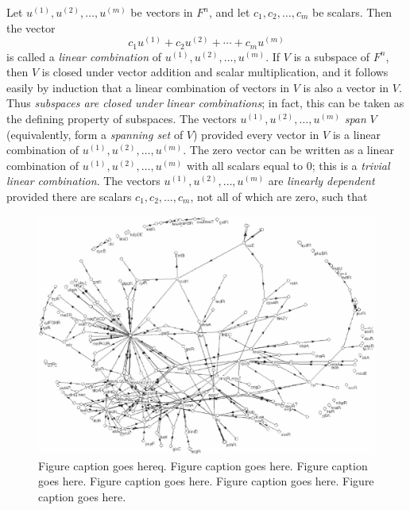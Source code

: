 \begin{definition}\label{1def:linearcomb}{\rm
Let $u^{(1)},u^{(2)},\ldots,u^{(m)}$ be vectors in $F^n$, and let 
$c_1,c_2,\ldots,c_m$ be scalars. Then the vector
\[c_1u^{(1)}+c_2u^{(2)}+\cdots+c_mu^{(m)}\]
is called a {\it linear combination}  of $u^{(1)},u^{(2)},\ldots,u^{(m)}$.
If $V$ is a subspace of $F^n$, then $V$ is closed under vector addition and 
scalar multiplication, and it follows easily by induction that a 
linear combination of vectors in $V$ is also a vector in $V$. Thus 
{\it subspaces 
are closed under linear combinations}; in fact, this can be taken as the 
defining property of subspaces.
The vectors $u^{(1)},u^{(2)},\ldots,u^{(m)}$ {\it span} $V$ 
(equivalently, form a {\it spanning set} of $V$) provided every vector in 
$V$ 
is a linear combination of $u^{(1)},u^{(2)},\ldots,u^{(m)}$. The zero 
vector can be written as a linear combination of 
$u^{(1)},u^{(2)},\ldots,u^{(m)}$ with all scalars equal to 0; this is a 
{\it trivial linear combination}. The vectors
$u^{(1)},u^{(2)},\ldots,u^{(m)}$ are {\it linearly dependent} provided 
there are scalars $c_1,c_2,\ldots,c_m$, not all of which are zero, such 
that

\begin{figure}[t!]
\centering
\includegraphics[width=\totalwidth]{Chapters/chapter1/figures/002x003.eps}
\caption[Short figure caption]{Figure caption goes hereq. Figure caption goes here.
Figure caption goes here. Figure caption goes here. Figure caption goes here.
Figure caption goes here.}
\end{figure}



}
\end{definition}
